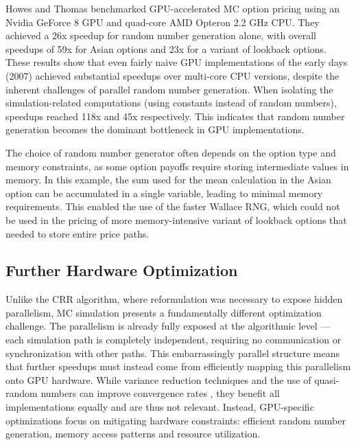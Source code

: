 \documentclass[english,12pt,a4paper,pdftex,sci,utf8]{aaltothesis}
\begin{document}
Howes and Thomas \cite{nguyen2007gpu} benchmarked GPU-accelerated MC option pricing using an Nvidia GeForce 8 GPU and quad-core AMD Opteron 2.2 GHz CPU. They achieved a 26x speedup for random number generation alone, with overall speedups of 59x for Asian options and 23x for a variant of lookback options. These results show that even fairly naive GPU implementations of the early days (2007) achieved substantial speedups over multi-core CPU versions, despite the inherent challenges of parallel random number generation. When isolating the simulation-related computations (using constants instead of random numbers), speedups reached 118x and 45x respectively. This indicates that random number generation becomes the dominant bottleneck in GPU implementations. 

The choice of random number generator often depends on the option type and memory constraints, as some option payoffs require storing intermediate values in memory. In this example, the sum used for the mean calculation in the Asian option can be accumulated in a single variable, leading to minimal memory requirements. This enabled the use of the faster Wallace RNG, which could not be used in the pricing of more memory-intensive variant of lookback options that needed to store entire price paths.

\subsection{Further Hardware Optimization}
Unlike the CRR algorithm, where reformulation was necessary to expose hidden parallelism, MC simulation presents a fundamentally different optimization challenge. The parallelism is already fully exposed at the algorithmic level --- each simulation path is completely independent, requiring no communication or synchronization with other paths. This embarrassingly parallel structure means that further speedups must instead come from efficiently mapping this parallelism onto GPU hardware. While variance reduction techniques and the use of quasi-random numbers can improve convergence rates \cite{clewlow1998implementing}, they benefit all implementations equally and are thus not relevant. Instead, GPU-specific optimizations focus on mitigating hardware constraints: efficient random number generation, memory access patterns and resource utilization. 
\end{document}
